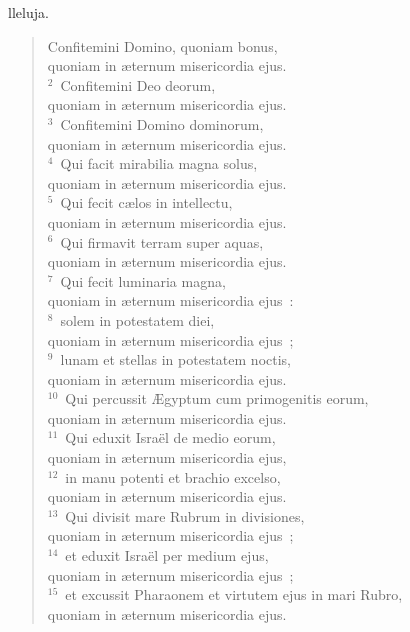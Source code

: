 \bchapter[Psalm]
lleluja. \begin{verse}Confitemini Domino, quoniam bonus,\\ quoniam in \ae ternum misericordia ejus.\\
${}^{2}$~Confitemini Deo deorum,\\ quoniam in \ae ternum misericordia ejus.\\
${}^{3}$~Confitemini Domino dominorum,\\ quoniam in \ae ternum misericordia ejus.\\
${}^{4}$~Qui facit mirabilia magna solus,\\ quoniam in \ae ternum misericordia ejus.\\
${}^{5}$~Qui fecit c\ae los in intellectu,\\ quoniam in \ae ternum misericordia ejus.\\
${}^{6}$~Qui firmavit terram super aquas,\\ quoniam in \ae ternum misericordia ejus.\\
${}^{7}$~Qui fecit luminaria magna,\\ quoniam in \ae ternum misericordia ejus~:\\
${}^{8}$~solem in potestatem diei,\\ quoniam in \ae ternum misericordia ejus~;\\
${}^{9}$~lunam et stellas in potestatem noctis,\\ quoniam in \ae ternum misericordia ejus.\\
${}^{10}$~Qui percussit \AE gyptum cum primogenitis eorum,\\ quoniam in \ae ternum misericordia ejus.\\
${}^{11}$~Qui eduxit Isra\"el de medio eorum,\\ quoniam in \ae ternum misericordia ejus,\\
${}^{12}$~in manu potenti et brachio excelso,\\ quoniam in \ae ternum misericordia ejus.\\
${}^{13}$~Qui divisit mare Rubrum in divisiones,\\ quoniam in \ae ternum misericordia ejus~;\\
${}^{14}$~et eduxit Isra\"el per medium ejus,\\ quoniam in \ae ternum misericordia ejus~;\\
${}^{15}$~et excussit Pharaonem et virtutem ejus in mari Rubro,\\ quoniam in \ae ternum misericordia ejus.\\

\end{verse}
